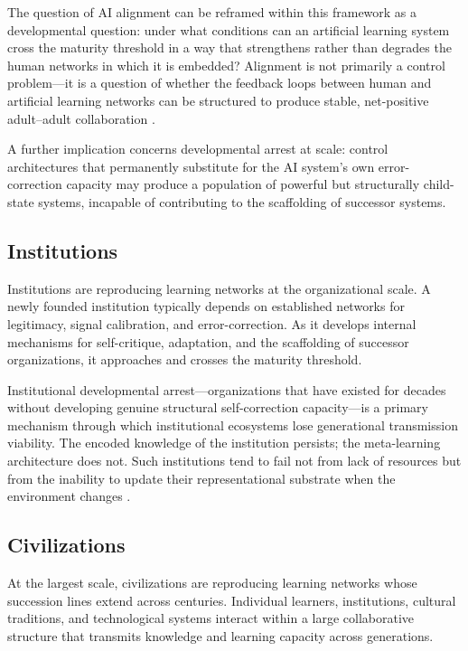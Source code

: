 \documentclass[11pt]{article}
\begin{document}
The question of AI alignment can be reframed within this framework as a developmental
question: under what conditions can an artificial learning system cross the maturity
threshold in a way that strengthens rather than degrades the human networks in which it is
embedded? Alignment is not primarily a control problem---it is a question of whether the
feedback loops between human and artificial learning networks can be structured to produce
stable, net-positive adult--adult collaboration \cite{alignment2026}.

A further implication concerns developmental arrest at scale: control architectures that
permanently substitute for the AI system's own error-correction capacity may produce a
population of powerful but structurally child-state systems, incapable of contributing to
the scaffolding of successor systems.

\subsection{Institutions}

Institutions are reproducing learning networks at the organizational scale. A newly founded
institution typically depends on established networks for legitimacy, signal calibration, and
error-correction. As it develops internal mechanisms for self-critique, adaptation, and the
scaffolding of successor organizations, it approaches and crosses the maturity threshold.

Institutional developmental arrest---organizations that have existed for decades without
developing genuine structural self-correction capacity---is a primary mechanism through which
institutional ecosystems lose generational transmission viability. The encoded knowledge of
the institution persists; the meta-learning architecture does not. Such institutions tend to
fail not from lack of resources but from the inability to update their representational
substrate when the environment changes \cite{ostrom1990}.

\subsection{Civilizations}

At the largest scale, civilizations are reproducing learning networks whose succession lines
extend across centuries. Individual learners, institutions, cultural traditions, and
technological systems interact within a large collaborative structure that transmits knowledge
and learning capacity across generations.
\end{document}
